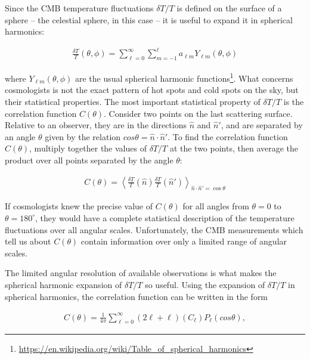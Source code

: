 \documentclass[a4paper,11pt]{article}
\begin{document}
Since the CMB temperature fluctuations $\delta T/T$ is defined on the surface of a sphere -- the celestial sphere, in this case -- it is useful to expand it in spherical harmonics:

\begin{align*}
    \frac{\delta T}{T}(\theta,\phi) = \sum\limits_{\ell=0}^{\infty}\sum\limits_{m=-1}^{\ell} a_{\ell m}Y_{\ell m}(\theta,\phi)
\end{align*}

{\noindent}where $Y_{\ell m}(\theta,\phi)$ are the usual spherical harmonic functions\footnote{\href{https://en.wikipedia.org/wiki/Table\_of\_spherical\_harmonics}{https://en.wikipedia.org/wiki/Table\_of\_spherical\_harmonics}}. What concerns cosmologists is not the exact pattern of hot spots and cold spots on the sky, but their statistical properties. The most important statistical property of $\delta T/T$ is the correlation function $C(\theta)$. Consider two points on the last scattering surface. Relative to an observer, they are in the directions $\hat{n}$ and $\hat{n}'$, and are separated by an angle $\theta$ given by the relation $cos\theta=\hat{n}\cdot\hat{n}'$. To find the correlation function $C(\theta)$, multiply together the values of $\delta T/T$ at the two points, then average the product over all points separated by the angle $\theta$:

\begin{align*}
    C(\theta) = \left\langle\frac{\delta T}{T}(\hat{n})\frac{\delta T}{T}(\hat{n}')\right\rangle_{\hat{n}\cdot\hat{n}'=\cos\theta}
\end{align*}

{\noindent}If cosmologists knew the precise value of $C(\theta)$ for all angles from $\theta=0$ to $\theta=180^\circ$, they would have a complete statistical description of the temperature fluctuations over all angular scales. Unfortunately, the CMB measurements which tell us about $C(\theta)$ contain information over only a limited range of angular scales.

{\noindent}The limited angular resolution of available observations is what makes the spherical harmonic expansion of $\delta T/T$ so useful. Using the expansion of $\delta T/T$ in spherical harmonics, the correlation function can be written in the form

\begin{align*}
    C(\theta) = \frac{1}{4\pi} \sum\limits_{\ell=0}^\infty (2\ell+\ell)(C_\ell)P_\ell(cos\theta),
\end{align*}
\end{document}
